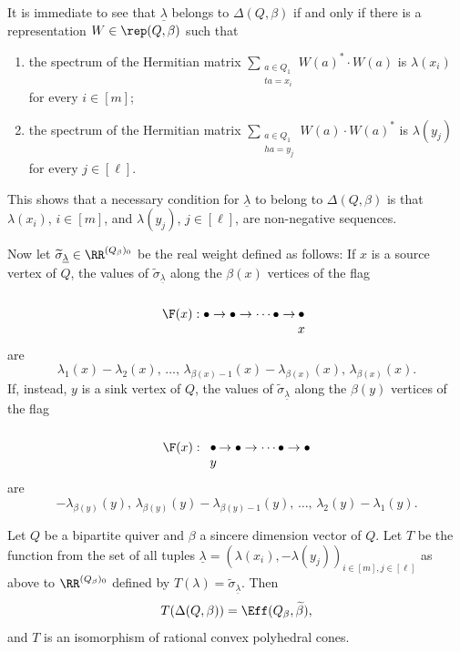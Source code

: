 \begin{remark} \label{spectra-delta-rmk} It is immediate to see that $\underline{\lambda}$ belongs to $\Delta(Q, \beta)$ if and only if there is a representation $W \in \rep(Q, \beta)$ such that 
\begin{enumerate}
\item the spectrum of the Hermitian matrix $
\sum_{\substack{a \in Q_1 \\ ta=x_i}} W(a)^* \cdot W(a)$ is $\lambda(x_i)$ for every $i \in [m]$;
\item the spectrum of the Hermitian matrix $\sum_{\substack{a \in Q_1 \\ ha=y_j}} W(a) \cdot W(a)^*$ is $\lambda(y_j)$ for every $j \in [\ell]$.
\end{enumerate}
This shows that a necessary condition for $\underline{\lambda}$ to belong to $\Delta(Q, \beta)$ is that $\lambda(x_i)$, $i \in [m]$, and $\lambda(y_j)$, $j \in [\ell]$, are non-negative sequences.
\end{remark}

Now let $\widetilde{\sigma}_{\underline{\lambda}} \in \RR^{(Q_\beta)_0}$ be the real weight defined as follows: If $x$ is a source vertex of $Q$, the values of $\widetilde{\sigma}_{\underline{\lambda}}$ along the $\beta(x)$ vertices of the flag 
\[
\F(x) :  \bullet \rightarrow \bullet \rightarrow \cdots \bullet \rightarrow \hspace{-6pt} \begin{array}{c}\\ \bullet \\ x \end{array}
\]
are 
$$
\lambda_1(x) - \lambda_2(x), \, \ldots, \, \lambda_{\beta(x)-1}(x) - \lambda_{\beta(x)}(x), \, \lambda_{\beta(x)}(x).
$$
If, instead, $y$ is a sink vertex of $Q$, the values of $\widetilde{\sigma}_{\underline{\lambda}}$ along the $\beta(y)$ vertices of the flag
\[
\F(x) : \begin{array}{c}\\ \bullet \\ y \end{array} \hspace{-6pt} \rightarrow \bullet \rightarrow \cdots \bullet \rightarrow \bullet
\]
are 
$$
-\lambda_{\beta(y)}(y), \,  \lambda_{\beta(y)}(y) - \lambda_{\beta(y)-1}(y), \, \ldots, \, \lambda_2(y) - \lambda_1(y).
$$
\begin{prop} \label{moment-cone-effecive-cone-prop} Let $Q$ be a bipartite quiver and $\beta$ a sincere dimension vector of $Q$. Let $T$ be the function from the set of all tuples $\underline{\lambda} = (\lambda(x_i), -\lambda(y_j))_{i \in [m], j \in [\ell]}$ as above to $\RR^{(Q_\beta)_0}$ defined by $T(\lambda) = \widetilde{\sigma}_{\underline{\lambda}}$. Then
$$
T(\Delta(Q, \beta))=\Eff(Q_\beta, \widetilde{\beta}),
$$
and $T$ is an isomorphism of rational convex polyhedral cones.
\end{prop}


